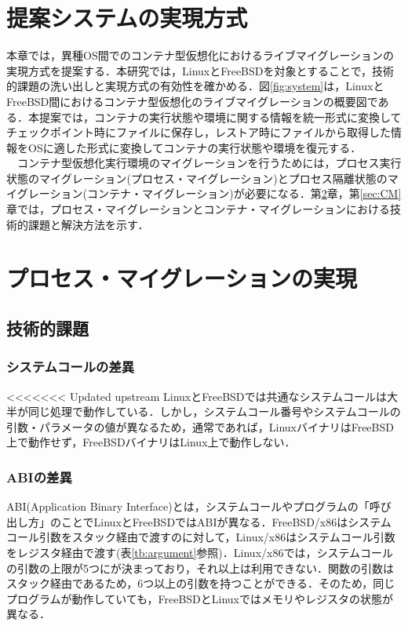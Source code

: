 \documentclass[11pt]{jarticle}
\begin{document}
\section{提案システムの実現方式}
\label{sec:suggest}
本章では，異種OS間でのコンテナ型仮想化におけるライブマイグレーションの実現方式を提案する．本研究では，LinuxとFreeBSDを対象とすることで，技術的課題の洗い出しと実現方式の有効性を確かめる．図\ref{fig:system}は，LinuxとFreeBSD間におけるコンテナ型仮想化のライブマイグレーションの概要図である．本提案では，コンテナの実行状態や環境に関する情報を統一形式に変換してチェックポイント時にファイルに保存し，レストア時にファイルから取得した情報をOSに適した形式に変換してコンテナの実行状態や環境を復元する．\\
　コンテナ型仮想化実行環境のマイグレーションを行うためには，プロセス実行状態のマイグレーション(プロセス・マイグレーション)とプロセス隔離状態のマイグレーション(コンテナ・マイグレーション)が必要になる．第\ref{sec:PM}章，第\ref{sec:CM}章では，プロセス・マイグレーションとコンテナ・マイグレーションにおける技術的課題と解決方法を示す．


\section{プロセス・マイグレーションの実現}
\label{sec:PM}
\subsection{技術的課題}
\subsubsection{システムコールの差異}
<<<<<<< Updated upstream
LinuxとFreeBSDでは共通なシステムコールは大半が同じ処理で動作している．しかし，システムコール番号やシステムコールの引数・パラメータの値が異なるため，通常であれば，LinuxバイナリはFreeBSD上で動作せず，FreeBSDバイナリはLinux上で動作しない．
\subsubsection{ABIの差異}
ABI(Application Binary Interface)とは，システムコールやプログラムの「呼び出し方」のことでLinuxとFreeBSDではABIが異なる．FreeBSD/x86はシステムコール引数をスタック経由で渡すのに対して，Linux/x86はシステムコール引数をレジスタ経由で渡す(表\ref{tb:argument}参照)\cite{hello}．Linux/x86では，システムコールの引数の上限が5つにが決まっており，それ以上は利用できない．関数の引数はスタック経由であるため，6つ以上の引数を持つことができる．そのため，同じプログラムが動作していても，FreeBSDとLinuxではメモリやレジスタの状態が異なる．
\end{document}
